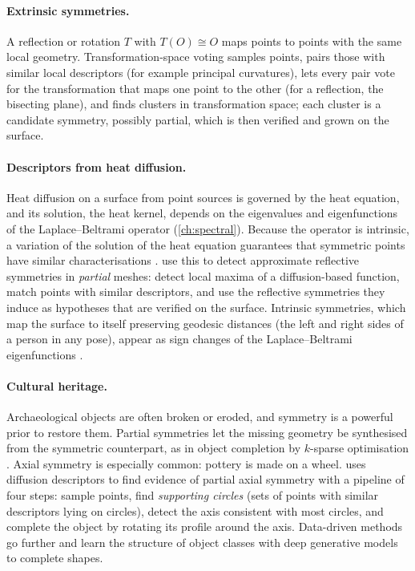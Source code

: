 \paragraph{Extrinsic symmetries.} A reflection or rotation $T$ with $T(O)\cong O$ maps points to points
with the same local geometry. Transformation-space voting \citep{Mitra2006} samples points, pairs those
with similar local descriptors (for example principal curvatures), lets every pair vote for the
transformation that maps one point to the other (for a reflection, the bisecting plane), and finds
clusters in transformation space; each cluster is a candidate symmetry, possibly partial, which is then
verified and grown on the surface.

\paragraph{Descriptors from heat diffusion.} Heat diffusion on a surface from point sources is
governed by the heat equation, and its solution, the heat kernel, depends on the eigenvalues and
eigenfunctions of the Laplace--Beltrami operator (\cref{ch:spectral}). Because the operator is
intrinsic, a variation of the solution of the heat equation guarantees that symmetric points have
similar characterisations \citep{Sun2009}.  use this to detect approximate
reflective symmetries in \emph{partial} meshes: detect local maxima of a diffusion-based function,
match points with similar descriptors, and use the reflective symmetries they induce as hypotheses that
are verified on the surface. Intrinsic symmetries, which map the surface to itself preserving geodesic
distances (the left and right sides of a person in any pose), appear as sign changes of the
Laplace--Beltrami eigenfunctions \citep{Ovsjanikov2008}.

\paragraph{Cultural heritage.} Archaeological objects are often broken or eroded, and symmetry is a
powerful prior to restore them. Partial symmetries let the missing geometry be synthesised from the
symmetric counterpart, as in object completion by $k$-sparse optimisation \citep{Mavridis2015}.
Axial symmetry is especially common: pottery is made on a wheel.  uses diffusion
descriptors to find evidence of partial axial symmetry with a pipeline of four steps: sample points,
find \emph{supporting circles} (sets of points with similar descriptors lying on circles), detect the
axis consistent with most circles, and complete the object by rotating its profile around the axis.
Data-driven methods go further and learn the structure of object classes with deep generative models to
complete shapes.

